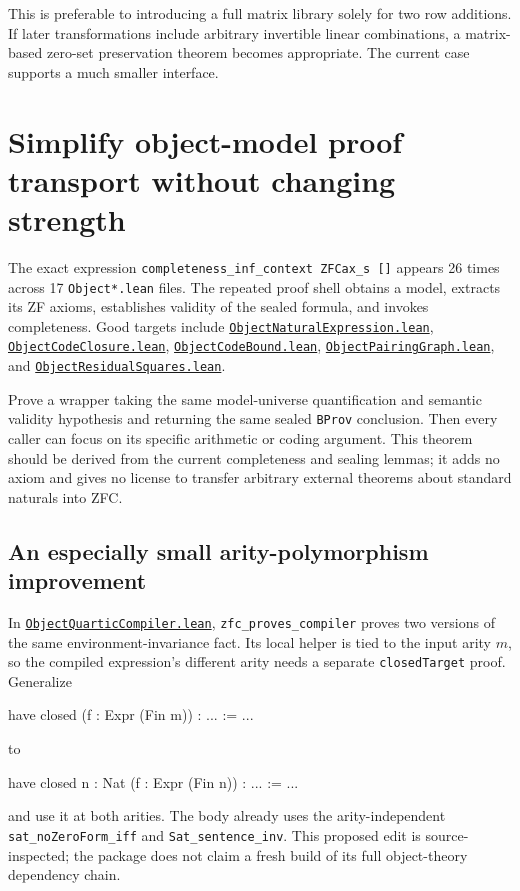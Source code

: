 \documentclass[11pt,letterpaper]{article}
\newcommand{\code}[1]{\nolinkurl{#1}}
\newcommand{\src}[2]{\href{https://github.com/VladimirReshetnikov/ProveIt/blob/60e9c5d620c6c387d932876cfa2d9376f64ea56c/Computability/DiophantineConsistency/Lean/DiophantineConsistency/#1.lean}{\code{#1.lean}}#2}
\begin{document}
This is preferable to introducing a full matrix library solely for two row
additions. If later transformations include arbitrary invertible linear
combinations, a matrix-based zero-set preservation theorem becomes appropriate.
The current case supports a much smaller interface.

\section{Simplify object-model proof transport without changing strength}
\label{sec:object}

The exact expression \code{completeness_inf_context ZFCax_s []} appears
26 times across 17 \code{Object*.lean} files. The repeated proof shell obtains
a model, extracts its ZF axioms, establishes validity of the sealed formula,
and invokes completeness. Good targets include
\src{ObjectNaturalExpression}{, }
\src{ObjectCodeClosure}{, }
\src{ObjectCodeBound}{, }
\src{ObjectPairingGraph}{, and }
\src{ObjectResidualSquares}{.}

Prove a wrapper taking the same model-universe quantification and semantic
validity hypothesis and returning the same sealed \code{BProv} conclusion.
Then every caller can focus on its specific arithmetic or coding argument.
This theorem should be derived from the current completeness and sealing
lemmas; it adds no axiom and gives no license to transfer arbitrary external
theorems about standard naturals into ZFC.

\subsection{An especially small arity-polymorphism improvement}

In \src{ObjectQuarticCompiler}{, \code{zfc_proves_compiler} proves two versions
of the same environment-invariance fact.}
Its local helper is tied to the input arity $m$, so the compiled expression's
different arity needs a separate \code{closedTarget} proof. Generalize

\begin{Lean}
have closed (f : Expr (Fin m)) : ... := ...
\end{Lean}

to

\begin{Lean}
have closed {n : Nat} (f : Expr (Fin n)) : ... := ...
\end{Lean}

and use it at both arities. The body already uses the arity-independent
\code{sat_noZeroForm_iff} and \code{Sat_sentence_inv}. This proposed edit is
source-inspected; the package does not claim a fresh build of its full
object-theory dependency chain.
\end{document}
